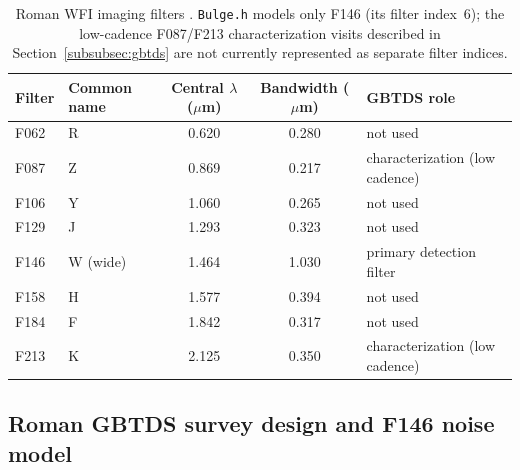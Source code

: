 \documentclass[english,10pt,a4paper]{article}
\begin{document}
	\begin{table}[htbp]
		\centering
		\footnotesize
		\begin{tabular}{llccl}
			\toprule
			Filter & Common name & Central $\lambda$ ($\mu$m) & Bandwidth ($\mu$m) & GBTDS role \\
			\midrule
			F062 & R & 0.620 & 0.280 & not used \\
			F087 & Z & 0.869 & 0.217 & characterization (low cadence) \\
			F106 & Y & 1.060 & 0.265 & not used \\
			F129 & J & 1.293 & 0.323 & not used \\
			F146 & W (wide) & 1.464 & 1.030 & primary detection filter \\
			F158 & H & 1.577 & 0.394 & not used \\
			F184 & F & 1.842 & 0.317 & not used \\
			F213 & K & 2.125 & 0.350 & characterization (low cadence) \\
			\bottomrule
		\end{tabular}
		\caption{Roman WFI imaging filters \cite{Wang2023RomanFilters}. \texttt{Bulge.h} models only F146 (its filter index~6); the low-cadence F087/F213 characterization visits described in Section~\ref{subsubsec:gbtds} are not currently represented as separate filter indices.}
		\label{tab:roman_filters}
	\end{table}
	
	\subsection{Roman GBTDS survey design and F146 noise model}
	
\end{document}
